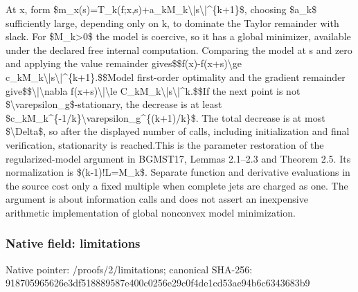 \documentclass[10pt,a4paper]{article}
\begin{document}
\begingroup\raggedright\sloppy At x,\allowbreak{} form \$m\_\allowbreak{}x(s)=\allowbreak{}T\_\allowbreak{}k(f;\allowbreak{}x,\allowbreak{}s)+a\_\allowbreak{}kM\_\allowbreak{}k\textbackslash{}|s\textbackslash{}|\textasciicircum{}\{k+1\}\$,\allowbreak{} choosing \$a\_\allowbreak{}k\$ sufficiently large,\allowbreak{} depending only on k,\allowbreak{} to dominate the Taylor remainder with slack. For \$M\_\allowbreak{}k>0\$ the model is coercive,\allowbreak{} so it has a global minimizer,\allowbreak{} available under the declared free internal computation. Comparing the model at s and zero and applying the value remainder gives\newline{}\$\$f(x)-f(x+s)\textbackslash{}ge c\_\allowbreak{}kM\_\allowbreak{}k\textbackslash{}|s\textbackslash{}|\textasciicircum{}\{k+1\}.\$\$\newline{}Model first-order optimality and the gradient remainder give\newline{}\$\$\textbackslash{}|\textbackslash{}nabla f(x+s)\textbackslash{}|\textbackslash{}le C\_\allowbreak{}kM\_\allowbreak{}k\textbackslash{}|s\textbackslash{}|\textasciicircum{}k.\$\$\newline{}If the next point is not \$\textbackslash{}varepsilon\_\allowbreak{}g\$-stationary,\allowbreak{} the decrease is at least \$c\_\allowbreak{}kM\_\allowbreak{}k\textasciicircum{}\{-1/\allowbreak{}k\}\textbackslash{}varepsilon\_\allowbreak{}g\textasciicircum{}\{(k+1)/\allowbreak{}k\}\$. The total decrease is at most \$\textbackslash{}Delta\$,\allowbreak{} so after the displayed number of calls,\allowbreak{} including initialization and final verification,\allowbreak{} stationarity is reached.\newline{}\newline{}This is the parameter restoration of the regularized-model argument in BGMST17,\allowbreak{} Lemmas 2.1{\AtlasUnicodeText –}\allowbreak{}2.3 and Theorem 2.5. Its normalization is \$(k-1)!L=\allowbreak{}M\_\allowbreak{}k\$. Separate function and derivative evaluations in the source cost only a fixed multiple when complete jets are charged as one. The argument is about information calls and does not assert an inexpensive arithmetic implementation of global nonconvex model minimization.\par\endgroup

\subsubsection{Native field: limitations}
Native pointer: /proofs/2/limitations; canonical SHA-256: 918705965626e3df518889587e400c0256e29c0f4de1cd53ae94b6c6343683b9
\end{document}
